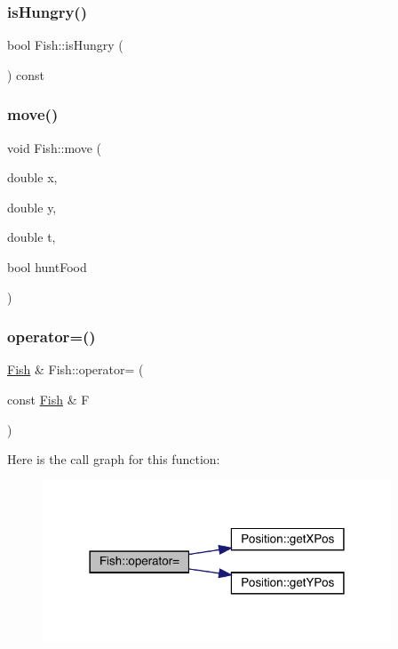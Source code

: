 \mbox{\label{class_fish_a0b45770c92baa9471ae6dc2ebf15d159}} 
\subsubsection{\texorpdfstring{is\+Hungry()}{isHungry()}}
{\footnotesize\ttfamily bool Fish\+::is\+Hungry (\begin{DoxyParamCaption}{ }\end{DoxyParamCaption}) const}

\mbox{\label{class_fish_ae746baf504f478e83b7b314b7e80eb48}} 
\subsubsection{\texorpdfstring{move()}{move()}}
{\footnotesize\ttfamily void Fish\+::move (\begin{DoxyParamCaption}\item[{double}]{x,  }\item[{double}]{y,  }\item[{double}]{t,  }\item[{bool}]{hunt\+Food }\end{DoxyParamCaption})}

\mbox{\label{class_fish_a45789c6c8ecafbcfae866845f34a7f33}} 
\subsubsection{\texorpdfstring{operator=()}{operator=()}}
{\footnotesize\ttfamily \mbox{\hyperlink{class_fish}{Fish}} \& Fish\+::operator= (\begin{DoxyParamCaption}\item[{const \mbox{\hyperlink{class_fish}{Fish}} \&}]{F }\end{DoxyParamCaption})}

Here is the call graph for this function\+:
\nopagebreak
\begin{figure}[H]
\begin{center}
\leavevmode
\includegraphics[width=294pt]{class_fish_a45789c6c8ecafbcfae866845f34a7f33_cgraph}
\end{center}
\end{figure}


